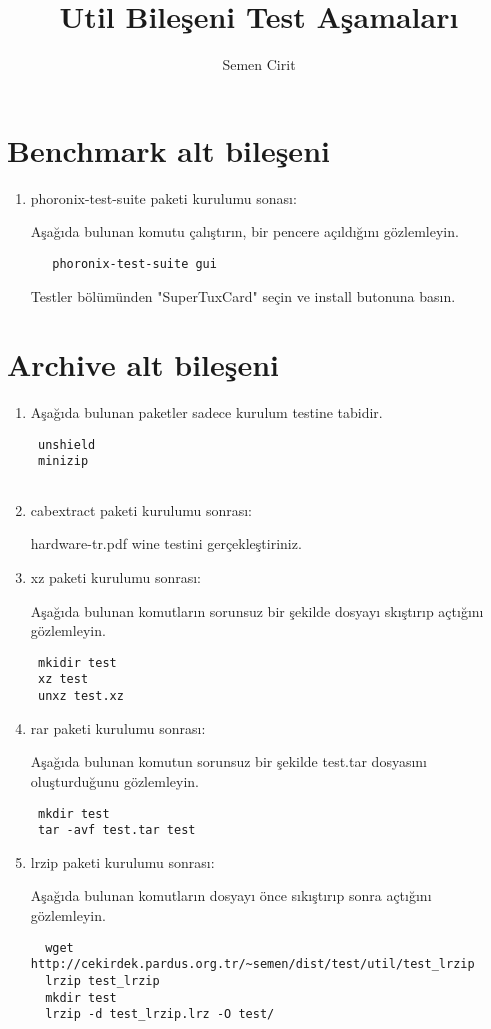 \documentclass[a4paper,10pt]{article}
\title{Util Bileşeni Test Aşamaları}
\author{Semen Cirit}
\begin{document}
\maketitle
\section{Benchmark alt bileşeni}
\begin{enumerate}
 \item phoronix-test-suite paketi kurulumu sonası:

Aşağıda bulunan komutu çalıştırın, bir pencere açıldığını gözlemleyin.
  \begin{verbatim}
   phoronix-test-suite gui
  \end{verbatim}

Testler bölümünden "SuperTuxCard" seçin ve install butonuna basın. 

\end{enumerate}


\section{Archive alt bileşeni}
\begin{enumerate}
\item Aşağıda bulunan paketler sadece kurulum testine tabidir.
\begin{verbatim}
 unshield
 minizip
 
\end{verbatim}
\item cabextract paketi kurulumu sonrası:

hardware-tr.pdf wine testini gerçekleştiriniz.

\item xz paketi kurulumu sonrası:

Aşağıda bulunan komutların sorunsuz bir şekilde dosyayı skıştırıp açtığını gözlemleyin.
\begin{verbatim}
 mkidir test
 xz test
 unxz test.xz
\end{verbatim}


\item rar paketi kurulumu sonrası:

Aşağıda bulunan komutun sorunsuz bir şekilde test.tar dosyasını oluşturduğunu gözlemleyin.
\begin{verbatim}
 mkdir test
 tar -avf test.tar test
\end{verbatim}


 \item lrzip paketi kurulumu sonrası:

Aşağıda bulunan komutların dosyayı önce sıkıştırıp sonra açtığını gözlemleyin.
\begin{verbatim}
  wget http://cekirdek.pardus.org.tr/~semen/dist/test/util/test_lrzip
  lrzip test_lrzip
  mkdir test
  lrzip -d test_lrzip.lrz -O test/
\end{verbatim}


\end{enumerate}
\end{document}

